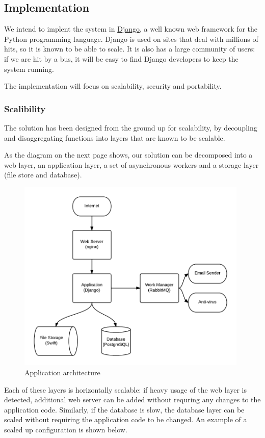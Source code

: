\documentclass[12pt]{article}
\begin{document}
\subsection{Implementation}

We intend to implent the system in \href{http://django.org}{Django}, a
well known web framework for the Python programming language. Django is
used on sites that deal with millions of hits, so it is known to be able
to scale. It is also has a large community of users: if we are hit by a
bus, it will be easy to find Django developers to keep the system
running.

The implementation will focus on scalability, security and portability.

\subsubsection{Scalibility}

The solution has been designed from the ground up for scalability, by
decoupling and disaggregating functions into layers that are known to be
scalable.

As the diagram on the next page shows, our solution can be decomposed into a web layer,
an application layer, a set of asynchronous workers and a storage layer
(file store and database).

\begin{figure}[htbp]
\centering
\includegraphics[width=0.98\textwidth]{./imgs/tech-overview.png}
\caption{Application architecture}
\end{figure}
\newpage
Each of these layers is horizontally scalable: if heavy usage of the
web layer is detected, additional web server can be added without
requring any changes to the application code. Similarly, if the
database is slow, the database layer can be scaled without requiring
the application code to be changed. An example of a scaled up
configuration is shown below.
\end{document}
